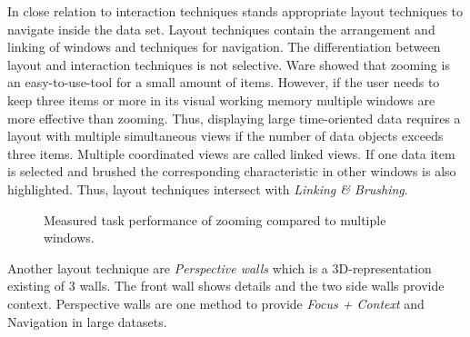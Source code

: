 In close relation to interaction techniques stands appropriate layout techniques to navigate inside the data set. Layout techniques contain the arrangement and linking of windows and techniques for navigation. The differentiation between layout and interaction techniques is not selective. Ware\cite{Ware2012} showed that zooming is an easy-to-use-tool for a small amount of items. However, if the user needs to keep three items or more in its visual working memory multiple windows are more effective than zooming. Thus, displaying large time-oriented data requires a layout with multiple simultaneous views if the number of data objects exceeds three items. Multiple coordinated views are called linked views. If one data item is selected and brushed the corresponding characteristic in other windows is also highlighted. Thus, layout techniques intersect with \textit{Linking & Brushing}. 
\begin{figure}[H]
    \centering
    \caption{Measured task performance of zooming compared to multiple windows. \cite{Ware2012a}}
    \label{fig:my_label}
\end{figure}
Another layout technique are \textit{Perspective walls} which is a 3D-representation existing of 3 walls. The front wall shows details and the two side walls provide context. Perspective walls are one method to provide \textit{Focus + Context} and Navigation in large datasets.

